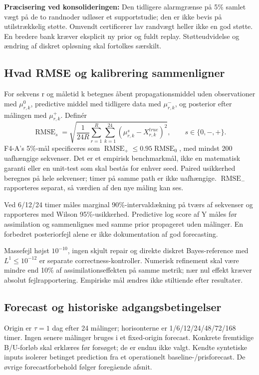 \textbf{Præcisering ved konsolideringen:} Den tidligere alarmgrænse på 5\% samlet
vægt på de to randnoder udløser et supportstudie; den er ikke bevis på utilstrækkelig
støtte. Omvendt certificerer lav randvægt heller ikke en god støtte. En bredere bank
kræver eksplicit ny prior og fuldt replay. Støtteudvidelse og ændring af diskret
opløsning skal fortolkes særskilt.

\subsection{Hvad RMSE og kalibrering sammenligner}
For sekvens r og måletid k betegnes åbent propagationsmiddel uden observationer med
\(\mu^0_{r,k}\), predictive middel med tidligere data med \(\mu^-_{r,k}\), og
posterior efter målingen med \(\mu^+_{r,k}\). Definér
\[
 \operatorname{RMSE}_{s}=\sqrt{\frac1{24R}\sum_{r=1}^{R}\sum_{k=1}^{24}
 (\mu^s_{r,k}-X^{true}_{r,k})^2},\qquad s\in\{0,-,+\}.
\]
F4-A's 5\%-mål specificeres som \(\operatorname{RMSE}_+\leq0.95\operatorname{RMSE}_0\),
med mindst 200 uafhængige sekvenser. Det er et empirisk benchmarkmål, ikke en
matematisk garanti eller en unit-test som skal bestås for enhver seed. Paired
usikkerhed beregnes på hele sekvenser; timer på samme path er ikke uafhængige.
\(\operatorname{RMSE}_-\) rapporteres separat, så værdien af den nye måling kan ses.

Ved 6/12/24 timer måles marginal 90\%-intervaldækning på tværs af sekvenser og
rapporteres med Wilson 95\%-usikkerhed. Predictive log score af Y måles før
assimilation og sammenlignes med samme prior propageret uden målinger. En forbedret
posteriorfejl alene er ikke dokumentation af god forecasting.

Massefejl højst \(10^{-10}\), ingen skjult repair og direkte diskret Bayes-reference
med \(L^1\leq10^{-12}\) er separate correctness-kontroller. Numerisk refinement skal
være mindre end 10\% af assimilationseffekten på samme metrik; nær nul effekt kræver
absolut fejlrapportering. Empiriske mål ændres ikke stiltiende efter resultater.

\subsection{Forecast og historiske adgangsbetingelser}
Origin er \(\tau=1\) dag efter 24 målinger; horisonterne er
1/6/12/24/48/72/168 timer. Ingen senere målinger bruges i et fixed-origin forecast.
Konkrete fremtidige B/U-forløb skal erklæres før forsøget; de er endnu ikke valgt.
Kendte syntetiske inputs isolerer betinget prediction fra et operationelt
baseline-/prisforecast. De øvrige forecastforbehold følger foregående afsnit.

